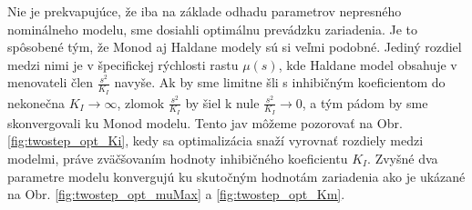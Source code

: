 Nie je prekvapujúce, že iba na základe odhadu parametrov nepresného nominálneho modelu, sme dosiahli optimálnu prevádzku zariadenia. Je to spôsobené tým, že Monod aj Haldane modely sú si veľmi podobné. Jediný rozdiel medzi nimi je v špecifickej rýchlosti rastu $ \mu(s) $, kde Haldane model obsahuje v menovateli člen $ \frac{s^2}{K_{I}} $ navyše. Ak by sme limitne šli s inhibičným koeficientom do nekonečna $ K_{I} \rightarrow \infty $, zlomok $ \frac{s^2}{K_{I}} $ by šiel k nule $ \frac{s^2}{K_{I}} \rightarrow 0 $, a tým pádom by sme skonvergovali ku Monod modelu. Tento jav môžeme pozorovať na Obr. \ref{fig:twostep_opt_Ki}, kedy sa optimalizácia snaží vyrovnať rozdiely medzi modelmi, práve zväčšovaním hodnoty inhibičného koeficientu $ K_{I} $. Zvyšné dva parametre modelu konvergujú ku skutočným hodnotám zariadenia ako je ukázané na Obr. \ref{fig:twostep_opt_muMax} a \ref{fig:twostep_opt_Km}. 
